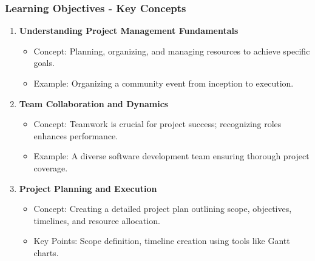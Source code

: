 \documentclass[aspectratio=169]{beamer}
\begin{document}
\begin{frame}[fragile]
    \frametitle{Learning Objectives - Key Concepts}
    \begin{enumerate}
        \item \textbf{Understanding Project Management Fundamentals}
            \begin{itemize}
                \item Concept: Planning, organizing, and managing resources to achieve specific goals.
                \item Example: Organizing a community event from inception to execution.
            \end{itemize}
        
        \item \textbf{Team Collaboration and Dynamics}
            \begin{itemize}
                \item Concept: Teamwork is crucial for project success; recognizing roles enhances performance.
                \item Example: A diverse software development team ensuring thorough project coverage.
            \end{itemize}
        
        \item \textbf{Project Planning and Execution}
            \begin{itemize}
                \item Concept: Creating a detailed project plan outlining scope, objectives, timelines, and resource allocation.
                \item Key Points: Scope definition, timeline creation using tools like Gantt charts.
            \end{itemize}
    \end{enumerate}
\end{frame}
\end{document}
